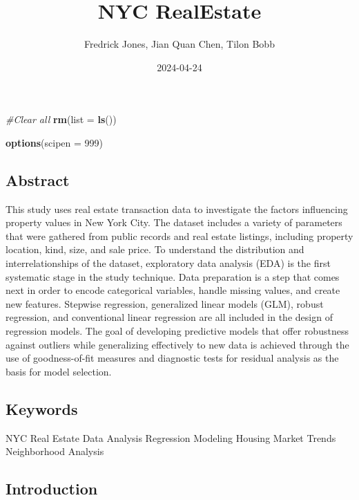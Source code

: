 \documentclass[
]{article}
\title{NYC RealEstate}
\author{Fredrick Jones, Jian Quan Chen, Tilon Bobb}
\date{2024-04-24}
\newenvironment{Shaded}{\begin{snugshade}}{\end{snugshade}}
\newcommand{\AttributeTok}[1]{\textcolor[rgb]{0.13,0.29,0.53}{#1}}
\newcommand{\CommentTok}[1]{\textcolor[rgb]{0.56,0.35,0.01}{\textit{#1}}}
\newcommand{\DecValTok}[1]{\textcolor[rgb]{0.00,0.00,0.81}{#1}}
\newcommand{\FunctionTok}[1]{\textcolor[rgb]{0.13,0.29,0.53}{\textbf{#1}}}
\newcommand{\NormalTok}[1]{#1}
\begin{document}
\maketitle

{
\setcounter{tocdepth}{2}
\tableofcontents
}
\begin{Shaded}
\begin{Highlighting}[]
\CommentTok{\#Clear all}
\FunctionTok{rm}\NormalTok{(}\AttributeTok{list =} \FunctionTok{ls}\NormalTok{())}

\FunctionTok{options}\NormalTok{(}\AttributeTok{scipen =} \DecValTok{999}\NormalTok{)}
\end{Highlighting}
\end{Shaded}

\hypertarget{abstract}{%
\subsection{Abstract}\label{abstract}}

This study uses real estate transaction data to investigate the factors
influencing property values in New York City. The dataset includes a
variety of parameters that were gathered from public records and real
estate listings, including property location, kind, size, and sale
price. To understand the distribution and interrelationships of the
dataset, exploratory data analysis (EDA) is the first systematic stage
in the study technique. Data preparation is a step that comes next in
order to encode categorical variables, handle missing values, and create
new features. Stepwise regression, generalized linear models (GLM),
robust regression, and conventional linear regression are all included
in the design of regression models. The goal of developing predictive
models that offer robustness against outliers while generalizing
effectively to new data is achieved through the use of goodness-of-fit
measures and diagnostic tests for residual analysis as the basis for
model selection.

\hypertarget{keywords}{%
\subsection{Keywords}\label{keywords}}

NYC Real Estate Data Analysis Regression Modeling Housing Market Trends
Neighborhood Analysis

\hypertarget{introduction}{%
\subsection{Introduction}\label{introduction}}
\end{document}
